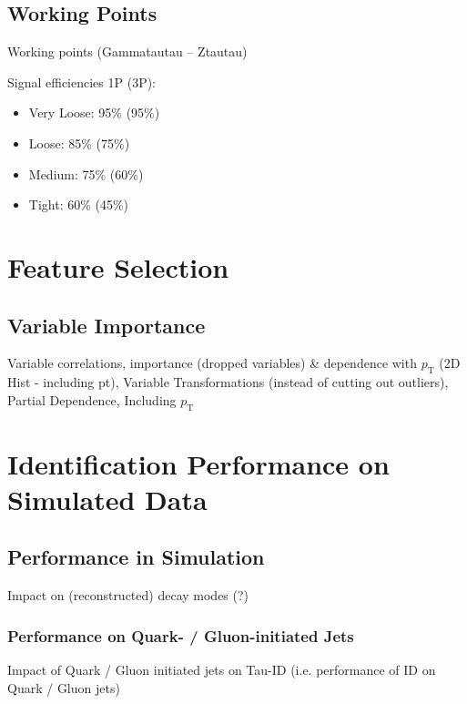 \subsection{Working Points}
\label{sec:bdt_working_points}

Working points (Gammatautau -- Ztautau)

Signal efficiencies 1P (3P):
\begin{itemize}
\item Very Loose: 95\% (95\%)
\item Loose: 85\% (75\%)
\item Medium: 75\% (60\%)
\item Tight: 60\% (45\%)
\end{itemize}

\section{Feature Selection}
\label{sec:bdt_feature_selection}

\subsection{Variable Importance}
\label{sec:bdt_var_importance}

Variable correlations, importance (dropped variables) \& dependence with
$p_\mathrm{T}$ (2D Hist - including pt), Variable Transformations (instead
of cutting out outliers), Partial Dependence, Including $p_\mathrm{T}$

\section{Identification Performance on Simulated Data}
\label{sec:bdt_perf}

\subsection{Performance in Simulation}
\label{sec:bdt_perf_sim}

Impact on (reconstructed) decay modes (?)

\subsubsection{Performance on Quark- / Gluon-initiated Jets}
\label{sec:bdt_perf_quark_gluon}

Impact of Quark / Gluon initiated jets on Tau-ID (i.e. performance of ID
on Quark / Gluon jets)

